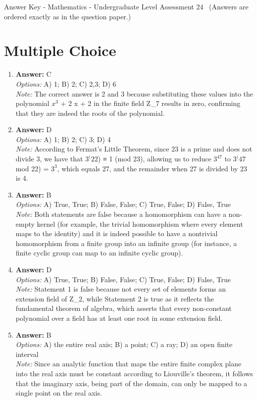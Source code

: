 \documentclass[12pt]{article}
\begin{document}
\begin{center}
Answer Key - Mathematics - Undergraduate Level Assessment 24 \
\small (Answers are ordered exactly as in the question paper.)
\end{center}

\section*{Multiple Choice}
\begin{enumerate}[label=\arabic*.]
\item \textbf{Answer:} C
\\ \textit{Options:} A) 1; B) 2; C) 2,3; D) 6
\\ \textit{Note:} The correct answer is 2 and 3 because substituting these values into the polynomial $x^3$ + 2 x + 2 in the finite field Z\_7 results in zero, confirming that they are indeed the roots of the polynomial.
\item \textbf{Answer:} D
\\ \textit{Options:} A) 1; B) 2; C) 3; D) 4
\\ \textit{Note:} According to Fermat's Little Theorem, since 23 is a prime and does not divide 3, we have that $3^(22$) ≡ 1 (mod 23), allowing us to reduce $3^47$ to $3^(47$ mod 22) = $3^3$, which equals 27, and the remainder when 27 is divided by 23 is 4.
\item \textbf{Answer:} B
\\ \textit{Options:} A) True, True; B) False, False; C) True, False; D) False, True
\\ \textit{Note:} Both statements are false because a homomorphism can have a non-empty kernel (for example, the trivial homomorphism where every element maps to the identity) and it is indeed possible to have a nontrivial homomorphism from a finite group into an infinite group (for instance, a finite cyclic group can map to an infinite cyclic group).
\item \textbf{Answer:} D
\\ \textit{Options:} A) True, True; B) False, False; C) True, False; D) False, True
\\ \textit{Note:} Statement 1 is false because not every set of elements forms an extension field of Z\_2, while Statement 2 is true as it reflects the fundamental theorem of algebra, which asserts that every non-constant polynomial over a field has at least one root in some extension field.
\item \textbf{Answer:} B
\\ \textit{Options:} A) the entire real axis; B) a point; C) a ray; D) an open finite interval
\\ \textit{Note:} Since an analytic function that maps the entire finite complex plane into the real axis must be constant according to Liouville's theorem, it follows that the imaginary axis, being part of the domain, can only be mapped to a single point on the real axis.
\end{enumerate}
\end{document}

